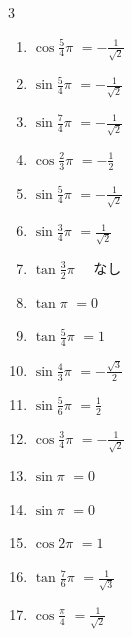 \begin{multicols}{3}
\begin{enumerate}
  \item $\displaystyle \cos{\frac{5}{4}\pi}$
        $\displaystyle =-\frac{1}{\sqrt{2}}$

  \item $\displaystyle \sin{\frac{5}{4}\pi}$
        $\displaystyle =-\frac{1}{\sqrt{2}}$

  \item $\displaystyle \sin{\frac{7}{4}\pi}$
        $\displaystyle =-\frac{1}{\sqrt{2}}$

  \item $\displaystyle \cos{\frac{2}{3}\pi}$
        $\displaystyle =-\frac{1}{2}$

  \item $\displaystyle \sin{\frac{5}{4}\pi}$
        $\displaystyle =-\frac{1}{\sqrt{2}}$

  \item $\displaystyle \sin{\frac{3}{4}\pi}$
        $\displaystyle =\frac{1}{\sqrt{2}}$

  \item $\displaystyle \tan{\frac{3}{2}\pi}$
        $\displaystyle \quad なし$

  \item $\displaystyle \tan{\pi}$
        $\displaystyle =0$

  \item $\displaystyle \tan{\frac{5}{4}\pi}$
        $\displaystyle =1$

  \item $\displaystyle \sin{\frac{4}{3}\pi}$
        $\displaystyle =-\frac{\sqrt{3}}{2}$

  \item $\displaystyle \sin{\frac{5}{6}\pi}$
        $\displaystyle =\frac{1}{2}$

  \item $\displaystyle \cos{\frac{3}{4}\pi}$
        $\displaystyle =-\frac{1}{\sqrt{2}}$

  \item $\displaystyle \sin{\pi}$
        $\displaystyle =0$

  \item $\displaystyle \sin{\pi}$
        $\displaystyle =0$

  \item $\displaystyle \cos{2\pi}$
        $\displaystyle =1$

  \item $\displaystyle \tan{\frac{7}{6}\pi}$
        $\displaystyle =\frac{1}{\sqrt{3}}$

  \item $\displaystyle \cos{\frac{\pi}{4}}$
        $\displaystyle =\frac{1}{\sqrt{2}}$


\end{enumerate}
\end{multicols}
